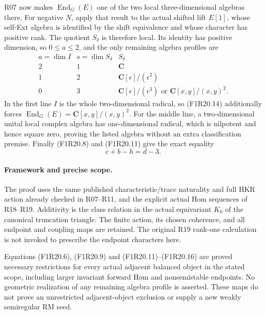 R07 now makes $\operatorname{End}_G(E)$ one of the two
local three-dimensional algebras there. For negative
$N$, apply that result to the actual shifted lift
$E[1]$, whose self-Ext algebra is identified by the
shift equivalence and whose character has positive rank.
The quotient $S_\delta$ is therefore local. Its identity
has positive dimension, so $0\le a\le2$, and the only
remaining algebra profiles are
\[
 \begin{array}{c|c|c}
 a=\dim I&s=\dim S_\delta&S_\delta\\ \hline
 2&1&\mathbf C\\
 1&2&\mathbf C[\epsilon]/(\epsilon^2)\\
 0&3&\mathbf C[\epsilon]/(\epsilon^3)
       \text{ or }\mathbf C[x,y]/(x,y)^2.
 \end{array}
 \tag{F1R20.15}
\]
In the first line $I$ is the whole two-dimensional
radical, so (F1R20.14) additionally forces
$\operatorname{End}_G(E)=\mathbf C[x,y]/(x,y)^2$.
For the middle line, a two-dimensional unital local
complex algebra has one-dimensional radical, which
is nilpotent and hence square zero, proving the
listed algebra without an extra classification premise.
Finally (F1R20.8) and (F1R20.11) give the exact equality
\[
                              c+b-h=d-3.
 \tag{F1R20.16}
\]

\paragraph{Framework and precise scope.}
The proof uses the same published characteristic/trace
naturality and full HKR action already checked in
R07--R11, and the explicit actual Hom sequences of
R18--R19. Additivity is the class relation in the
actual equivariant $K_0$ of the canonical truncation
triangle. The finite action, its chosen coherence,
and all endpoint and coupling maps are retained.
The original R19 rank-one calculation is not invoked
to prescribe the endpoint characters here.

Equations (F1R20.6), (F1R20.9) and
(F1R20.11)--(F1R20.16) are proved necessary restrictions
for every actual adjacent balanced object in the stated
scope, including larger invariant forward Hom and
nonsemistable endpoints. No geometric realization of
any remaining algebra profile is asserted. These maps
do not prove an unrestricted adjacent-object exclusion
or supply a new weakly semiregular RM seed.

